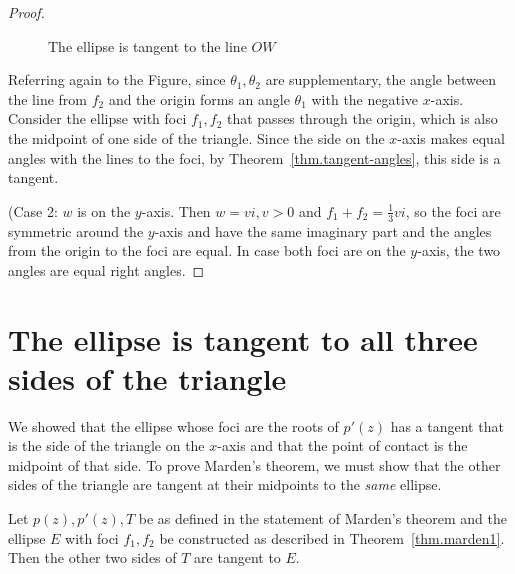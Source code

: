 \begin{proof}
\begin{figure}[t]
\begin{center}
\caption{The ellipse is tangent to the line $OW$}\label{f.marden-ellipses}
\end{center}
\end{figure}

Referring again to the Figure, since $\theta_1, \theta_2$ are supplementary, the angle between the line from $f_2$ and the origin forms an angle $\theta_1$ with the negative $x$-axis. Consider the ellipse with foci $f_1,f_2$ that passes through the origin, which is also the midpoint of one side of the triangle. Since the side on the $x$-axis makes equal angles with the lines to the foci, by Theorem~\ref{thm.tangent-angles}, this side is a tangent.

(Case 2: $w$ is on the $y$-axis. Then $w=vi, v>0$ and $f_1+f_2=\frac{1}{3}vi$, so the foci are symmetric around the $y$-axis and have the same imaginary part and the angles from the origin to the foci are equal. In case both foci are on the $y$-axis, the two angles are equal right angles.\hqed
\end{proof}


\section{The ellipse is tangent to all three sides of the triangle}

We showed that the ellipse whose foci are the roots of $p'(z)$ has a tangent that is the side of the triangle on the $x$-axis and that the point of contact is the midpoint of that side. To prove Marden's theorem, we must show that the other sides of the triangle are tangent at their midpoints to the \emph{same} ellipse. 

\begin{theorem}\label{thm.marden2}
Let $p(z),p'(z),T$ be as defined in the statement of Marden's theorem and the ellipse $E$ with foci $f_1,f_2$ be constructed as described in Theorem~\ref{thm.marden1}. Then the other two sides of $T$ are tangent to $E$.
\end{theorem}

